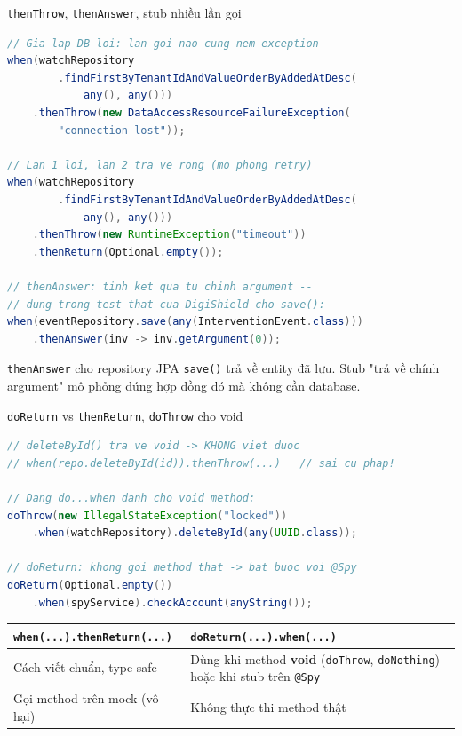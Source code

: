 \documentclass[aspectratio=169,12pt]{beamer}
\begin{document}
\begin{frame}[fragile]{\texttt{thenThrow}, \texttt{thenAnswer}, stub nhiều lần gọi}
\begin{lstlisting}[language=java,basicstyle=\ttfamily\scriptsize]
// Gia lap DB loi: lan goi nao cung nem exception
when(watchRepository
        .findFirstByTenantIdAndValueOrderByAddedAtDesc(
            any(), any()))
    .thenThrow(new DataAccessResourceFailureException(
        "connection lost"));

// Lan 1 loi, lan 2 tra ve rong (mo phong retry)
when(watchRepository
        .findFirstByTenantIdAndValueOrderByAddedAtDesc(
            any(), any()))
    .thenThrow(new RuntimeException("timeout"))
    .thenReturn(Optional.empty());

// thenAnswer: tinh ket qua tu chinh argument --
// dung trong test that cua DigiShield cho save():
when(eventRepository.save(any(InterventionEvent.class)))
    .thenAnswer(inv -> inv.getArgument(0));
\end{lstlisting}

  \begin{exampleblock}{\texttt{thenAnswer} cho repository}
    JPA \texttt{save()} trả về entity đã lưu. Stub "trả về chính argument"
    mô phỏng đúng hợp đồng đó mà không cần database.
  \end{exampleblock}
\end{frame}

\begin{frame}[fragile]{\texttt{doReturn} vs \texttt{thenReturn}, \texttt{doThrow} cho void}
\begin{lstlisting}[language=java,basicstyle=\ttfamily\footnotesize]
// deleteById() tra ve void -> KHONG viet duoc
// when(repo.deleteById(id)).thenThrow(...)   // sai cu phap!

// Dang do...when danh cho void method:
doThrow(new IllegalStateException("locked"))
    .when(watchRepository).deleteById(any(UUID.class));

// doReturn: khong goi method that -> bat buoc voi @Spy
doReturn(Optional.empty())
    .when(spyService).checkAccount(anyString());
\end{lstlisting}

  \begin{center}
  \footnotesize
  \setlength{\tabcolsep}{4pt}
  \begin{tabular}{>{\raggedright\arraybackslash}p{5.4cm}>{\raggedright\arraybackslash}p{6.6cm}}
    \toprule
    \textbf{\texttt{when(...)\allowbreak.thenReturn(...)}} & \textbf{\texttt{doReturn(...).when(...)}} \\
    \midrule
    Cách viết chuẩn, type-safe & Dùng khi method \textbf{void} (\texttt{doThrow},
      \texttt{doNothing}) hoặc khi stub trên \texttt{@Spy} \\
    Gọi method trên mock (vô hại) & Không thực thi method thật \\
    \bottomrule
  \end{tabular}
  \end{center}
\end{frame}
\end{document}
